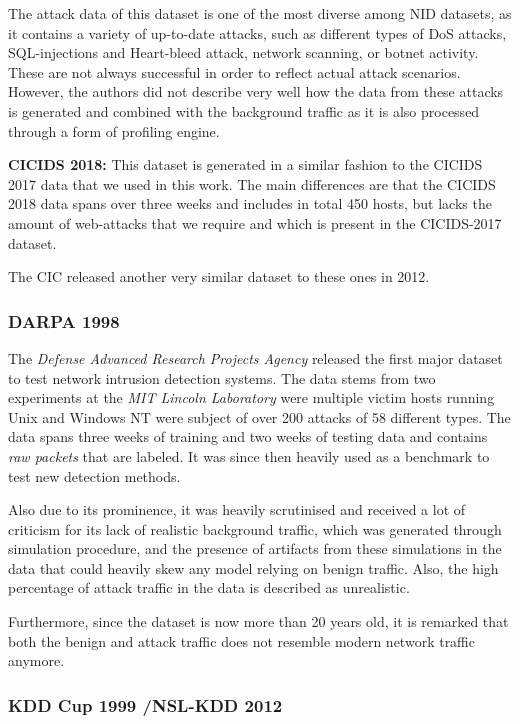 The attack data of this dataset is one of the most diverse among NID datasets, as it contains a variety of up-to-date attacks, such as different types of DoS attacks, SQL-injections and Heart-bleed attack, network scanning, or botnet activity. These are not always successful in order to reflect actual attack scenarios. However, the authors did not describe very well how the data from these attacks is generated and combined with the background traffic as it is also processed through a form of profiling engine. 

\textbf{CICIDS 2018:}
This dataset is generated in a similar fashion to the CICIDS 2017 data that we used in this work. The main differences are that the CICIDS 2018 data spans over three weeks and includes in total 450 hosts, but lacks the amount of web-attacks that we require and which is present in the CICIDS-2017 dataset.

The CIC released another very similar dataset to these ones in 2012.

\subsubsection*{DARPA 1998 \cite{lippmann2000evaluating}}

The \textit{Defense Advanced Research Projects Agency} released the first major dataset to test network intrusion detection systems. The data stems from two experiments at the \textit{MIT Lincoln Laboratory} were multiple victim hosts running Unix and Windows NT were subject of over 200 attacks of 58 different types. The data spans three weeks of training and two weeks of testing data and contains \textit{raw packets} that are labeled. It was since then heavily used as a benchmark to test new detection methods. %

Also due to its prominence, it was heavily scrutinised and received a lot of criticism for its lack of realistic background traffic, which was generated through simulation procedure, and the presence of artifacts from these simulations in the data that could heavily skew any model relying on benign traffic. Also, the high percentage of attack traffic in the data is described as unrealistic.

Furthermore, since the dataset is now more than 20 years old, it is remarked that both the benign and attack traffic does not resemble modern network traffic anymore. 

\subsubsection*{KDD Cup 1999 \cite{cup1999data,cup1999dataset}/NSL-KDD 2012 \cite{tavallaee2012nsl}}

